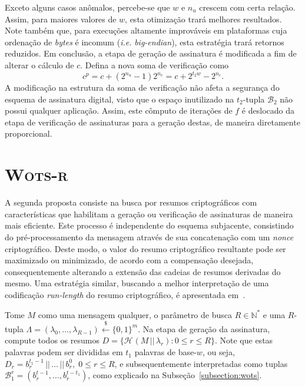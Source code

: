 \documentclass[12pt,notitlepage]{report}
\newcommand{\hash}[2][]{\mathcal{H}^{#1}(#2)}
\newcommand{\concat}{\, \vert \vert \,}
\newcommand{\binwds}[1]{\{0, 1\}^{#1}}
\begin{document}
Exceto alguns casos anômalos, percebe-se que $w$ e $n_u$ crescem com certa relação. Assim, para maiores valores de $w$, esta otimização trará melhores resultados. Note também que, para execuções altamente improváveis em plataformas cuja ordenação de \emph{bytes} é incomum (\emph{i.e.} \emph{big-endian}), esta estratégia trará retornos reduzidos. Em conclusão, a etapa de geração de assinatura é modificada a fim de alterar o cálculo de $c$. Defina a nova soma de verificação como
\begin{equation}
    c^p = c + (2^{n_u} - 1)2^{n_c} = c + 2^{t_2w} - 2^{n_c}.
\end{equation}
A modificação na estrutura da soma de verificação não afeta a segurança do esquema de assinatura digital, visto que o espaço inutilizado na $t_2$-tupla $\mathcal{B}_2$ não possui qualquer aplicação. Assim, este cômputo de iterações de $f$ é deslocado da etapa de verificação de assinaturas para a geração destas, de maneira diretamente proporcional.

\section{\textsc{Wots-r}}
\label{section:wotsr}

A segunda proposta consiste na busca por resumos criptográficos com características que habilitam a geração ou verificação de assinaturas de maneira mais eficiente. Este processo é independente do esquema subjacente, consistindo do pré-processamento da mensagem através de sua concatenação com um \emph{nonce} criptográfico. Deste modo, o valor do resumo criptográfico resultante pode ser maximizado ou minimizado, de acordo com a compensação desejada, consequentemente alterando a extensão das cadeias de resumos derivadas do mesmo. Uma estratégia similar, buscando a melhor interpretação de uma codificação \emph{run-length} do resumo criptográfico, é apresentada em~\cite{Steinwandt2008}.

Tome $M$ como uma mensagem qualquer, o parâmetro de busca $R \in \mathbb{N}^{*}$ e uma $R$-tupla $\Lambda = (\lambda_0, \dots, \lambda_{R - 1}) \stackrel{\$}{\longleftarrow} \binwds{m}$. Na etapa de geração da assinatura, compute todos os resumos $D = \{\hash{M \concat \lambda_r} : 0 \leq r \leq R\}$. Note que estas palavras podem ser divididas em $t_1$ palavras de base-$w$, ou seja, $D_r = b_{r}^{t_1 - 1} \concat \dots \concat b_{r}^{0}, \; 0 \leq r \leq R$, e subsequentemente interpretadas como tuplas $\mathcal{B}_{1}^{r} = (b_{r}^{t - 1}, \dots, b_{r}^{t - t_1})$, como explicado na Subseção~\ref{subsection:wots}.
\end{document}
